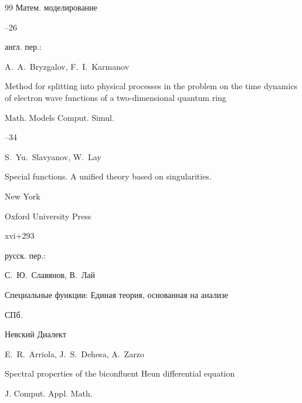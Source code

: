 \begin{thebibliography}{99}
\jour Матем. моделирование




--26


\transl англ. пер.:~

\by A.~A.~Bryzgalov, F.~I.~Karmanov

\paper Method for splitting into physical processes in the problem on the time dynamics of electron wave functions of a two-dimensional quantum ring

\jour Math. Models Comput. Simul.




--34






%


\by S.~Yu.~Slavyanov, W.~Lay

\book Special functions. A unified theory based on singularities.

\publaddr New York

\publ Oxford University Press


\totalpages xvi+293

\rtransl

русск. пер.:

\by С.~Ю.~Славянов, В.~Лай

\book Специальные функции: Единая теория, основанная на анализе

\publaddr СПб.

\publ Невский Диалект








\by E.~R.~Arriola, J.~S.~Dehesa, A.~Zarzo

\paper Spectral properties of the biconfluent Heun differential equation

\jour J. Comput. Appl. Math.


\end{thebibliography}
